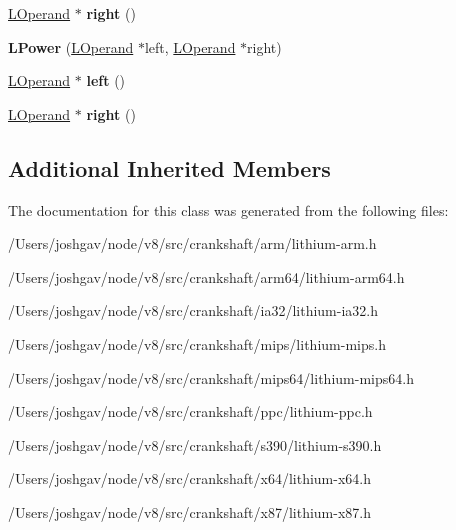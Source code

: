 \begin{DoxyCompactItemize}
\item 
\hyperlink{classv8_1_1internal_1_1_l_operand}{L\+Operand} $\ast$ {\bfseries right} ()\hypertarget{classv8_1_1internal_1_1_l_power_a0fed7eab4c328436c3fdd482dff64858}{}\label{classv8_1_1internal_1_1_l_power_a0fed7eab4c328436c3fdd482dff64858}

\item 
{\bfseries L\+Power} (\hyperlink{classv8_1_1internal_1_1_l_operand}{L\+Operand} $\ast$left, \hyperlink{classv8_1_1internal_1_1_l_operand}{L\+Operand} $\ast$right)\hypertarget{classv8_1_1internal_1_1_l_power_a208b7005a17806de5c09a8e3c2a0776f}{}\label{classv8_1_1internal_1_1_l_power_a208b7005a17806de5c09a8e3c2a0776f}

\item 
\hyperlink{classv8_1_1internal_1_1_l_operand}{L\+Operand} $\ast$ {\bfseries left} ()\hypertarget{classv8_1_1internal_1_1_l_power_a49182f8649cd35386ec8d19f8d7b8157}{}\label{classv8_1_1internal_1_1_l_power_a49182f8649cd35386ec8d19f8d7b8157}

\item 
\hyperlink{classv8_1_1internal_1_1_l_operand}{L\+Operand} $\ast$ {\bfseries right} ()\hypertarget{classv8_1_1internal_1_1_l_power_a0fed7eab4c328436c3fdd482dff64858}{}\label{classv8_1_1internal_1_1_l_power_a0fed7eab4c328436c3fdd482dff64858}

\end{DoxyCompactItemize}
\subsection*{Additional Inherited Members}


The documentation for this class was generated from the following files\+:\begin{DoxyCompactItemize}
\item 
/\+Users/joshgav/node/v8/src/crankshaft/arm/lithium-\/arm.\+h\item 
/\+Users/joshgav/node/v8/src/crankshaft/arm64/lithium-\/arm64.\+h\item 
/\+Users/joshgav/node/v8/src/crankshaft/ia32/lithium-\/ia32.\+h\item 
/\+Users/joshgav/node/v8/src/crankshaft/mips/lithium-\/mips.\+h\item 
/\+Users/joshgav/node/v8/src/crankshaft/mips64/lithium-\/mips64.\+h\item 
/\+Users/joshgav/node/v8/src/crankshaft/ppc/lithium-\/ppc.\+h\item 
/\+Users/joshgav/node/v8/src/crankshaft/s390/lithium-\/s390.\+h\item 
/\+Users/joshgav/node/v8/src/crankshaft/x64/lithium-\/x64.\+h\item 
/\+Users/joshgav/node/v8/src/crankshaft/x87/lithium-\/x87.\+h\end{DoxyCompactItemize}
